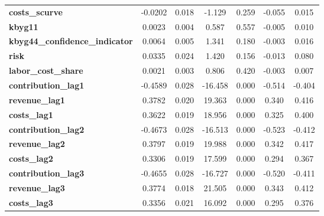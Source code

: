 \begin{center}
\begin{tabular}{lcccccc}
\textbf{costs\_scurve}                 &      -0.0202  &        0.018     &    -1.129  &         0.259        &       -0.055    &        0.015     \\
\textbf{kbyg11}                        &       0.0023  &        0.004     &     0.587  &         0.557        &       -0.005    &        0.010     \\
\textbf{kbyg44\_confidence\_indicator} &       0.0064  &        0.005     &     1.341  &         0.180        &       -0.003    &        0.016     \\
\textbf{risk}                          &       0.0335  &        0.024     &     1.420  &         0.156        &       -0.013    &        0.080     \\
\textbf{labor\_cost\_share}            &       0.0021  &        0.003     &     0.806  &         0.420        &       -0.003    &        0.007     \\
\textbf{contribution\_lag1}            &      -0.4589  &        0.028     &   -16.458  &         0.000        &       -0.514    &       -0.404     \\
\textbf{revenue\_lag1}                 &       0.3782  &        0.020     &    19.363  &         0.000        &        0.340    &        0.416     \\
\textbf{costs\_lag1}                   &       0.3622  &        0.019     &    18.956  &         0.000        &        0.325    &        0.400     \\
\textbf{contribution\_lag2}            &      -0.4673  &        0.028     &   -16.513  &         0.000        &       -0.523    &       -0.412     \\
\textbf{revenue\_lag2}                 &       0.3797  &        0.019     &    19.988  &         0.000        &        0.342    &        0.417     \\
\textbf{costs\_lag2}                   &       0.3306  &        0.019     &    17.599  &         0.000        &        0.294    &        0.367     \\
\textbf{contribution\_lag3}            &      -0.4655  &        0.028     &   -16.727  &         0.000        &       -0.520    &       -0.411     \\
\textbf{revenue\_lag3}                 &       0.3774  &        0.018     &    21.505  &         0.000        &        0.343    &        0.412     \\
\textbf{costs\_lag3}                   &       0.3356  &        0.021     &    16.092  &         0.000        &        0.295    &        0.376     \\

\end{tabular}
\end{center}
